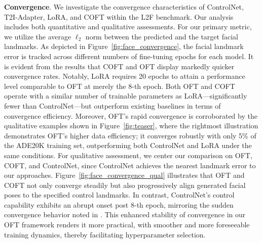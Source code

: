 \textbf{Convergence}. We investigate the convergence characteristics of ControlNet, T2I-Adapter, LoRA, and COFT within the L2F benchmark. Our analysis includes both quantitative and qualitative assessments. For our primary metric, we utilize the average $\ell_2$ norm between the predicted and the target facial landmarks. As depicted in Figure~\ref{fig:face_convergence}, the facial landmark error is tracked across different numbers of fine-tuning epochs for each model. It is evident from the results that COFT and OFT display markedly quicker convergence rates. Notably, LoRA requires 20 epochs to attain a performance level comparable to OFT at merely the 8-th epoch. Both OFT and COFT operate with a similar number of trainable parameters as LoRA—significantly fewer than ControlNet—but outperform existing baselines in terms of convergence efficiency. Moreover, OFT's rapid convergence is corroborated by the qualitative examples shown in Figure~\ref{fig:teaser}, where the rightmost illustration demonstrates OFT's higher data efficiency; it converges robustly with only 5\% of the ADE20K training set, outperforming both ControlNet and LoRA under the same conditions. For qualitative assessment, we center our comparison on OFT, COFT, and ControlNet, since ControlNet achieves the nearest landmark error to our approaches. Figure~\ref{fig:face_convergence_qual} illustrates that OFT and COFT not only converge steadily but also progressively align generated facial poses to the specified control landmarks. In contrast, ControlNet’s control capability exhibits an abrupt onset post 8-th epoch, mirroring the sudden convergence behavior noted in \cite{zhang2023adding}. This enhanced stability of convergence in our OFT framework renders it more practical, with smoother and more foreseeable training dynamics, thereby facilitating hyperparameter selection.

